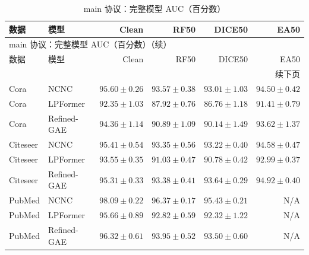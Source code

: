 {\small
\setlength{\tabcolsep}{3.2pt}
\renewcommand{\arraystretch}{1.10}
\begin{longtable}{llrrrr}
\caption{main 协议：完整模型 AUC（百分数）}\\
\toprule
数据 & 模型 & Clean & RF50 & DICE50 & EA50 \\
\midrule
\endfirsthead
\multicolumn{6}{l}{main 协议：完整模型 AUC（百分数）（续）}\\
\toprule
数据 & 模型 & Clean & RF50 & DICE50 & EA50 \\
\midrule
\endhead
\midrule\multicolumn{6}{r}{续下页}\\
\endfoot
\bottomrule
\endlastfoot
Cora & NCNC & $95.60\pm0.26$ & $93.57\pm0.38$ & $93.01\pm1.03$ & $94.50\pm0.42$ \\
Cora & LPFormer & $92.35\pm1.03$ & $87.92\pm0.76$ & $86.76\pm1.18$ & $91.41\pm0.79$ \\
Cora & Refined-GAE & $94.36\pm1.14$ & $90.89\pm1.09$ & $90.14\pm1.49$ & $93.62\pm1.37$ \\
Citeseer & NCNC & $95.41\pm0.54$ & $93.35\pm0.56$ & $93.22\pm0.40$ & $94.58\pm0.47$ \\
Citeseer & LPFormer & $93.55\pm0.35$ & $91.03\pm0.47$ & $90.78\pm0.42$ & $92.99\pm0.37$ \\
Citeseer & Refined-GAE & $95.31\pm0.33$ & $93.38\pm0.41$ & $93.64\pm0.29$ & $94.92\pm0.40$ \\
PubMed & NCNC & $98.09\pm0.22$ & $96.37\pm0.17$ & $95.43\pm0.21$ & N/A \\
PubMed & LPFormer & $95.66\pm0.89$ & $92.82\pm0.59$ & $92.32\pm1.22$ & N/A \\
PubMed & Refined-GAE & $96.32\pm0.61$ & $93.95\pm0.52$ & $93.50\pm0.60$ & N/A \\
\end{longtable}
}
